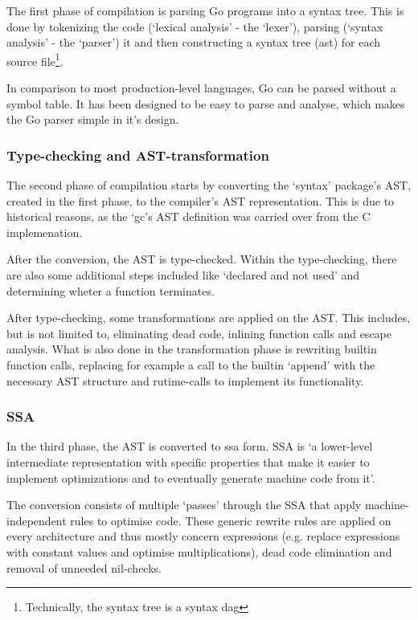 The first phase of compilation is parsing Go programs into a syntax tree. This
is done by tokenizing the code (`lexical analysis' - the `lexer'), parsing
(`syntax analysis' - the `parser') it and then constructing a syntax tree (\gls{ast}) for
each source file\footnote{Technically, the syntax tree is a syntax \gls{dag}\autocite{ast-node-dag}}.

In comparison to most production-level languages, Go can be parsed without a
symbol table. It has been designed to be easy to parse
and analyse, which makes the Go parser simple in it's design\autocite{go-faq-symbol}.

\subsubsection{Type-checking and AST-transformation}\label{sec:comp-type}

The second phase of compilation starts by converting the `syntax' package's
AST, created in the first phase, to the compiler's AST representation. This
is due to historical reasons, as the `gc's AST definition was carried over
from the C implemenation.

After the conversion, the AST is type-checked. Within the type-checking, there
are also some additional steps included like `declared and not used' and
determining wheter a function terminates.

After type-checking, some transformations are applied on the AST. This includes,
but is not limited to, eliminating dead code, inlining function calls and escape
analysis. What is also done in the transformation phase is rewriting builtin function
calls, replacing for example a call to the builtin `append' with the necessary
AST structure and rutime-calls to implement its functionality.

\subsubsection{SSA}

In the third phase, the AST is converted to \gls{ssa} form. SSA  is `a
lower-level intermediate representation with specific properties that make it
easier to implement optimizations and to eventually generate machine code from
it'\autocite{compiler-readme}.

The conversion consists of multiple `passes' through the SSA that
apply machine-independent rules to optimise code. These generic
rewrite rules are applied on every architecture and thus mostly
concern expressions (e.g. replace expressions with constant values and
optimise multiplications), dead code elimination and removal of unneeded
nil-checks.

